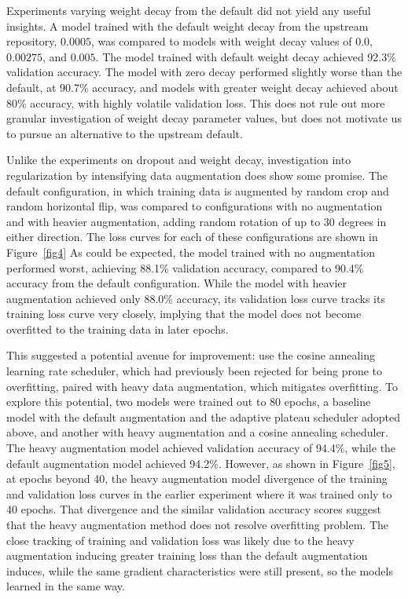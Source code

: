 \documentclass[letterpaper]{article} %
\begin{document}
Experiments varying weight decay from the default did not yield any useful insights.
A model trained with the default weight decay from the upstream repository, $0.0005 $,
was compared to models with weight decay values of $ 0.0 $, $ 0.00275 $, and $ 0.005 $.
The model trained with default weight decay achieved 92.3\% validation accuracy.
The model with zero decay performed slightly worse than the default, at 90.7\% accuracy, and
models with greater weight decay achieved about 80\% accuracy, with highly volatile validation
loss.
This does not rule out more granular investigation of weight decay parameter values, but does not
motivate us to pursue an alternative to the upstream default.

Unlike the experiments on dropout and weight decay, investigation into regularization by
intensifying data augmentation does show some promise.
The default configuration, in which training data is augmented by random crop and random horizontal flip,
was compared to configurations with no augmentation and with heavier augmentation,
adding random rotation of up to 30 degrees in either direction.
The loss curves for each of these configurations are shown in Figure~\ref{fig4}
As could be expected, the model trained with no augmentation performed worst,
achieving 88.1\% validation accuracy, compared to 90.4\% accuracy from the default configuration.
While the model with heavier augmentation achieved only 88.0\% accuracy, its
validation loss curve tracks its training loss curve very closely, implying that
the model does not become overfitted to the training data in later epochs.

This suggested a potential avenue for improvement: use the cosine annealing learning rate scheduler,
which had previously been rejected for being prone to overfitting, paired with heavy
data augmentation, which mitigates overfitting.
To explore this potential, two models were trained out to 80 epochs, a baseline model with the
default augmentation and the adaptive plateau scheduler adopted above, and another with
heavy augmentation and a cosine annealing scheduler.
The heavy augmentation model achieved validation accuracy of 94.4\%, while the default
augmentation model achieved 94.2\%.
However, as shown in Figure~\ref{fig5}, at epochs beyond 40, the heavy augmentation
model divergence of the training and validation loss curves in the earlier experiment
where it was trained only to 40 epochs.
That divergence and the similar validation accuracy scores suggest that the heavy augmentation
method does not resolve overfitting problem.
The close tracking of training and validation loss was likely due to the heavy
augmentation inducing greater training loss than the default augmentation induces,
while the same gradient characteristics were still present, so the models learned
in the same way.
\end{document}
